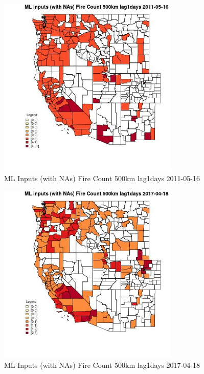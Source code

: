 \begin{figure} 
\centering  
\includegraphics[width=0.77\textwidth]{Code_Outputs/Report_ML_input_PM25_Step4_part_e_de_duplicated_aves_compiled_2019-05-21wNAs_CountyFire_Count_500km_lag1daysMean2011-05-16.jpg} 
\caption{\label{fig:Report_ML_input_PM25_Step4_part_e_de_duplicated_aves_compiled_2019-05-21wNAsCountyFire_Count_500km_lag1daysMean2011-05-16}ML Inputs (with NAs) Fire Count 500km lag1days 2011-05-16} 
\end{figure} 
 

\begin{figure} 
\centering  
\includegraphics[width=0.77\textwidth]{Code_Outputs/Report_ML_input_PM25_Step4_part_e_de_duplicated_aves_compiled_2019-05-21wNAs_CountyFire_Count_500km_lag1daysMean2017-04-18.jpg} 
\caption{\label{fig:Report_ML_input_PM25_Step4_part_e_de_duplicated_aves_compiled_2019-05-21wNAsCountyFire_Count_500km_lag1daysMean2017-04-18}ML Inputs (with NAs) Fire Count 500km lag1days 2017-04-18} 
\end{figure} 
 


